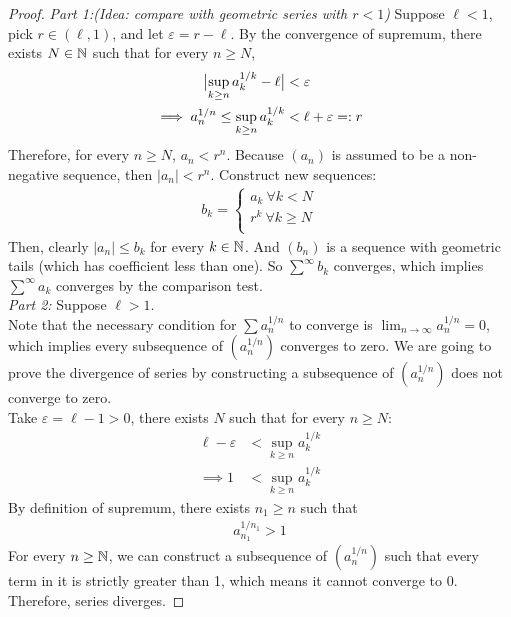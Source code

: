 \documentclass[11pt]{article}
\begin{document}
	\begin{proof}
		\emph{Part 1:(Idea: compare with geometric series with $r < 1$)} Suppose $\ell < 1$, pick $r \in (\ell, 1)$, and let $\varepsilon = r - \ell$. By the convergence of supremum, there exists $N \in \mathbb{N}$ such that for every $n \geq N$,
		\begin{align}
			\big \vert {
			\sup_{k \geq n} a_k^{1/k} - \ell
			} \big \vert &< \varepsilon \\
			\implies a_n^{1/n} \leq \sup_{k \geq n} a_k^{1/k} &< \ell + \varepsilon =: r
		\end{align}
		Therefore, for every $n \geq N$, $a_n < r^{n}$. Because $(a_n)$ is assumed to be a non-negative sequence, then $|a_n| < r^{n}$. Construct new sequences:
		\begin{align}
			b_k = 
			\begin{cases}
				a_k\ \forall k < N \\
				r^k\ \forall k \geq N \\
			\end{cases}
		\end{align}
		Then, clearly $|a_n| \leq b_k$ for every $k \in \mathbb{N}$. And $(b_n)$ is a sequence with geometric tails (which has coefficient less than one). So $\sum^\infty b_k$ converges, which implies $\sum^\infty a_k$ converges by the comparison test.
		\\
		\emph{Part 2:} Suppose $\ell > 1$. \\
		Note that the necessary condition for $\sum a_n^{1/n}$ to converge is $\lim_{n \to \infty} a_n^{1/n} = 0$, which implies every subsequence of $(a_n^{1/n})$ converges to zero. We are going to prove the divergence of series by constructing a subsequence of $(a_n^{1/n})$ does not converge to zero.\\
		Take $\varepsilon = \ell - 1 > 0$, there exists $N$ such that for every $n \geq N$:
		\begin{align}
			\ell - \varepsilon &< \sup_{k \geq n} a_k^{1/k} \\
			\implies 1 &< \sup_{k \geq n} a_k^{1/k}
		\end{align}
		By definition of supremum, there exists $n_1 \geq n$ such that
		\begin{align}
			a_{n_1}^{1/n_1} > 1
		\end{align}
		For every $n \geq \mathbb{N}$, we can construct a subsequence of $(a_n^{1/n})$ such that every term in it is strictly greater than 1, which means it cannot converge to 0. Therefore, series diverges.
		\end{proof}
	
\end{document}
